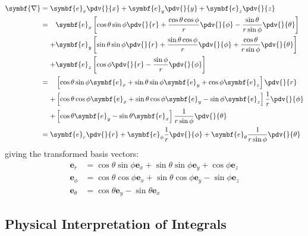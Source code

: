 \documentclass{article}
\begin{document}
\begin{align*}
    \symbf{\nabla} & = \symbf{e}_x \pdv{}{x} + \symbf{e}_y \pdv{}{y} + \symbf{e}_z \pdv{}{z}                                                    \\
                   & =
    \begin{aligned}[t]
          & \symbf{e}_x \left[ \cos{\theta} \sin{\phi} \pdv{}{r} + \frac{\cos{\theta}\cos{\phi}}{r} \pdv{}{\phi} - \frac{\sin{\theta}}{r \sin{\phi}} \pdv{}{\theta} \right] \\
        + & \symbf{e}_y \left[ \sin{\theta} \sin{\phi} \pdv{}{r} + \frac{\sin{\theta}\cos{\phi}}{r} \pdv{}{\phi} + \frac{\cos{\theta}}{r \sin{\phi}} \pdv{}{\theta} \right] \\
        + & \symbf{e}_z \left[ \cos{\phi} \pdv{}{r} - \frac{\sin{\phi}}{r} \pdv{}{\phi} \right]
    \end{aligned}
    \\
                   & =
    \begin{aligned}[t]
          & \left[ \cos{\theta} \sin{\phi} \symbf{e}_x + \sin{\theta} \sin{\phi} \symbf{e}_y + \cos{\phi} \symbf{e}_z \right] \pdv{}{r}              \\
        + & \left[ \cos{\theta}\cos{\phi} \symbf{e}_x + \sin{\theta}\cos{\phi} \symbf{e}_y - \sin{\phi} \symbf{e}_z \right] \frac{1}{r} \pdv{}{\phi} \\
        + & \left[ \cos{\theta} \symbf{e}_y - \sin{\theta} \symbf{e}_x \right] \frac{1}{r \sin{\phi}} \pdv{}{\theta}
    \end{aligned}
    \\
                   & = \symbf{e}_r \pdv{}{r} + \symbf{e}_\phi \frac{1}{r} \pdv{}{\phi} + \symbf{e}_\theta \frac{1}{r \sin{\phi}} \pdv{}{\theta}
\end{align*}
giving the transformed basis vectors:
\begin{align*}
    \symbf{e}_r      & = \cos{\theta} \sin{\phi} \symbf{e}_x + \sin{\theta} \sin{\phi} \symbf{e}_y + \cos{\phi} \symbf{e}_z \\
    \symbf{e}_\phi   & = \cos{\theta}\cos{\phi} \symbf{e}_x + \sin{\theta}\cos{\phi} \symbf{e}_y - \sin{\phi} \symbf{e}_z   \\
    \symbf{e}_\theta & = \cos{\theta} \symbf{e}_y - \sin{\theta} \symbf{e}_x
\end{align*}
\subsection{Physical Interpretation of Integrals}
\end{document}
